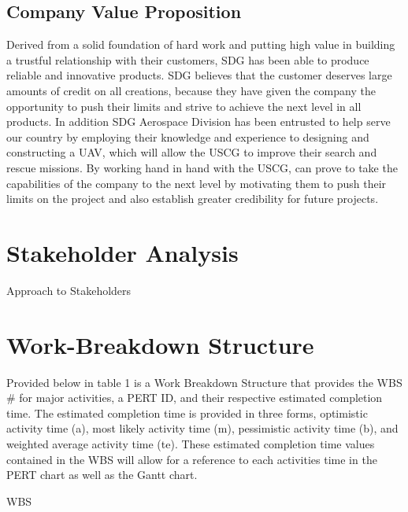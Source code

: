 \documentclass{article}
\begin{document}
\subsection{Company Value Proposition}
Derived from a solid foundation of hard work and putting high value in building a trustful relationship with their customers, SDG has been able to produce reliable and innovative products. SDG believes that the customer deserves large amounts of credit on all creations, because they have given the company the opportunity to push their limits and strive to achieve the next level in all products. In addition SDG Aerospace Division has been entrusted to help serve our country by employing their knowledge and experience to designing and constructing a UAV, which will allow the USCG to improve their search and rescue missions. By working hand in hand with the USCG, can prove to take the capabilities of the company to the next level by motivating them to push their limits on the project and also establish greater credibility for future projects.

\section{Stakeholder Analysis}

\begin{landscape}
	\begin{table}
	\caption{Approach to Stakeholders}
	\label{tableSH2}
	\end{table}
\end{landscape}

\section{Work-Breakdown Structure}
Provided below in table 1 is a Work Breakdown Structure that provides the WBS \# for major activities, a PERT ID, and their respective estimated completion time. The estimated completion time is provided in three forms, optimistic activity time (a), most likely activity time (m), pessimistic activity time (b), and weighted average activity time (te). These estimated completion time values contained in the WBS will allow for a reference to each activities time in the PERT chart as well as the Gantt chart.

\begin{landscape}
	\begin{table}
	\caption{WBS}
	\label{tableWBS}
	\end{table}
\end{landscape}
\end{document}
